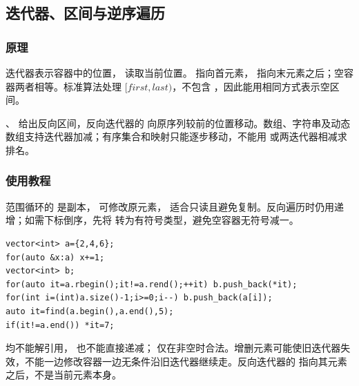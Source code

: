 \subsection{迭代器、区间与逆序遍历}
\label{stl:iterators}
\subsubsection*{原理}
迭代器表示容器中的位置， 读取当前位置。 指向首元素， 指向末元素之后；空容器两者相等。标准算法处理 $[first,last)$，不包含 ，因此能用相同方式表示空区间。

、 给出反向区间，反向迭代器的  向原序列较前的位置移动。数组、字符串及动态数组支持迭代器加减；有序集合和映射只能逐步移动，不能用  或两迭代器相减求排名。
\subsubsection*{使用教程}
范围循环的  是副本， 可修改原元素， 适合只读且避免复制。反向遍历时仍用递增；如需下标倒序，先将  转为有符号类型，避免空容器无符号减一。
\begin{lstlisting}[style=mtycpp,numbers=none]
vector<int> a={2,4,6};
for(auto &x:a) x+=1;
vector<int> b;
for(auto it=a.rbegin();it!=a.rend();++it) b.push_back(*it);
for(int i=(int)a.size()-1;i>=0;i--) b.push_back(a[i]);
auto it=find(a.begin(),a.end(),5);
if(it!=a.end()) *it=7;
\end{lstlisting}
 均不能解引用， 也不能直接递减； 仅在非空时合法。增删元素可能使旧迭代器失效，不能一边修改容器一边无条件沿旧迭代器继续走。反向迭代器的  指向其元素之后，不是当前元素本身。
